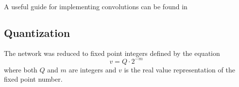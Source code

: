A useful guide for implementing convolutions can be found in \cite{dumoulin2016guide}


\subsection{Quantization}

The network was reduced to fixed point integers defined by the equation
\begin{equation}
	v = Q \cdot 2 ^{-m}
\end{equation}
where both $Q$ and $m$ are integers and $v$ is the real value representation of the fixed point number. 

